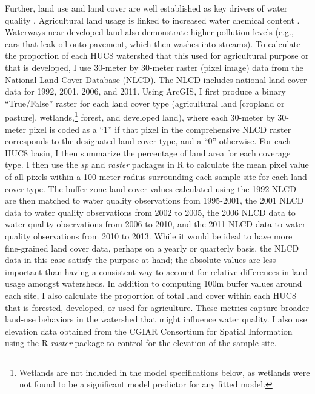 \documentclass[12pt,a4paper,titlepage]{article}
\begin{document}
Further, land use and land cover are well established as key drivers of water quality \parencite{tong2002,meador2003}. Agricultural land usage is linked to increased water chemical content \parencite{skaggs1994,johnes1997}. Waterways near developed land also demonstrate higher pollution levels \parencite{wang2001} (e.g., cars that leak oil onto pavement, which then washes into streams). To calculate the proportion of each HUC8 watershed that this used for agricultural purpose or that is developed, I use 30-meter by 30-meter raster (pixel image) data from the National Land Cover Database (NLCD). The NLCD includes national land cover data for 1992, 2001, 2006, and 2011. Using ArcGIS, I first produce a binary “True/False” raster for each land cover type (agricultural land [cropland or pasture], wetlands,\footnote{Wetlands are not included in the model specifications below, as wetlands were not found to be a significant model predictor for any fitted model.} forest, and developed land), where each 30-meter by 30-meter pixel is coded as a “1” if that pixel in the comprehensive NLCD raster corresponds to the designated land cover type, and a “0” otherwise. For each HUC8 basin, I then summarize the percentage of land area for each coverage type. I then use the \textit{sp} \parencite{pebesma2014} and \textit{raster} \parencite{hijmans2014} packages in R to calculate the mean pixel value of all pixels within a 100-meter radius surrounding each sample site for each land cover type. The buffer zone land cover values calculated using the 1992 NLCD are then matched to water quality observations from 1995-2001, the 2001 NLCD data to water quality observations from 2002 to 2005, the 2006 NLCD data to water quality observations from 2006 to 2010, and the 2011 NLCD data to water quality observations from 2010 to 2013. While it would be ideal to have more fine-grained land cover data, perhaps on a yearly or quarterly basis, the NLCD data in this case satisfy the purpose at hand; the absolute values are less important than having a consistent way to account for relative differences in land usage amongst watersheds. In addition to computing 100m buffer values around each site, I also calculate the proportion of total land cover within each HUC8 that is forested, developed, or used for agriculture. These metrics capture broader land-use behaviors in the watershed that might influence water quality. I also use elevation data obtained from the CGIAR Consortium for Spatial Information using the R \textit{raster} package \parencite{hijmans2014} to control for the elevation of the sample site.
\end{document}
